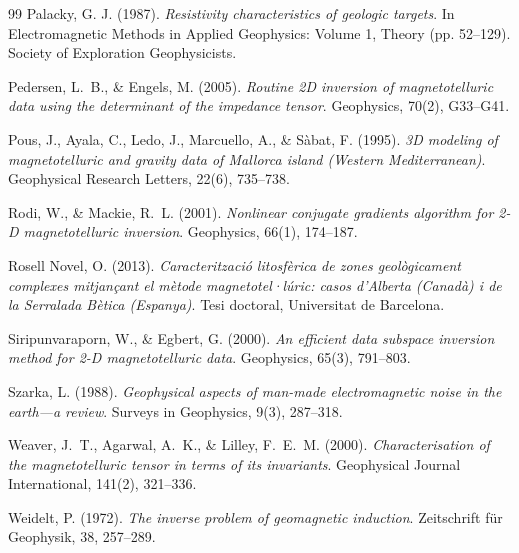 \documentclass[11pt,a4paper,oneside]{article}
\begin{document}
\begin{thebibliography}{99}
 Palacky, G. J. (1987).
  \textit{Resistivity characteristics of geologic targets}.
  In Electromagnetic Methods in Applied Geophysics: Volume 1, Theory (pp. 52--129). Society of Exploration Geophysicists.

 Pedersen, L.~B., \& Engels, M. (2005).
  \textit{Routine 2D inversion of magnetotelluric data using the determinant of the impedance tensor}.
  Geophysics, 70(2), G33--G41.

 Pous, J., Ayala, C., Ledo, J., Marcuello, A., \& Sàbat, F. (1995).
  \textit{3D modeling of magnetotelluric and gravity data of Mallorca island (Western Mediterranean)}.
  Geophysical Research Letters, 22(6), 735--738.

 Rodi, W., \& Mackie, R.~L. (2001).
  \textit{Nonlinear conjugate gradients algorithm for 2-D magnetotelluric inversion}.
  Geophysics, 66(1), 174--187.

 Rosell Novel, O. (2013).
  \textit{Caracterització litosfèrica de zones geològicament complexes mitjançant el mètode magnetotel·lúric: casos d’Alberta (Canadà) i de la Serralada Bètica (Espanya)}.
  Tesi doctoral, Universitat de Barcelona.

 Siripunvaraporn, W., \& Egbert, G. (2000).
  \textit{An efficient data subspace inversion method for 2-D magnetotelluric data}.
  Geophysics, 65(3), 791--803.

 Szarka, L. (1988).
  \textit{Geophysical aspects of man-made electromagnetic noise in the earth---a review}.
  Surveys in Geophysics, 9(3), 287--318.

 Weaver, J.~T., Agarwal, A.~K., \& Lilley, F.~E.~M. (2000).
  \textit{Characterisation of the magnetotelluric tensor in terms of its invariants}.
  Geophysical Journal International, 141(2), 321--336.

 Weidelt, P. (1972).
  \textit{The inverse problem of geomagnetic induction}.
  Zeitschrift für Geophysik, 38, 257--289.

\end{thebibliography}

\appendix
\clearpage
{}
{}
\makeatletter
{}
\makeatother
\begingroup
{}
\captionsetup{font=small,skip=3pt}
\end{document}
